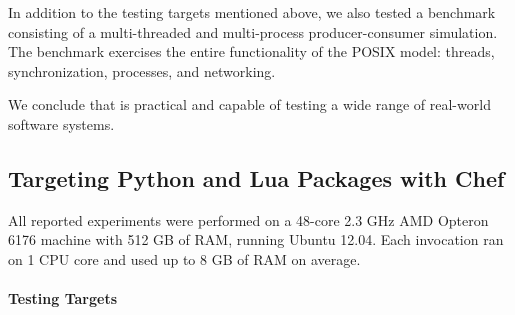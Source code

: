 In addition to the testing targets mentioned above, we also tested a benchmark consisting of a multi-threaded and multi-process producer-consumer simulation. The benchmark exercises the entire functionality of the POSIX model: threads, synchronization, processes, and networking. 

We conclude that \cnine is practical and capable of testing a wide range of real-world software systems.


\subsection{Targeting Python and Lua Packages with Chef}

All reported \chef experiments were performed on a 48-core 2.3 GHz AMD Opteron 6176 machine with 512 GB of RAM, running Ubuntu 12.04. Each \chef invocation ran on 1 CPU core and used up to 8 GB of RAM on average.

\paragraph{Testing Targets}

